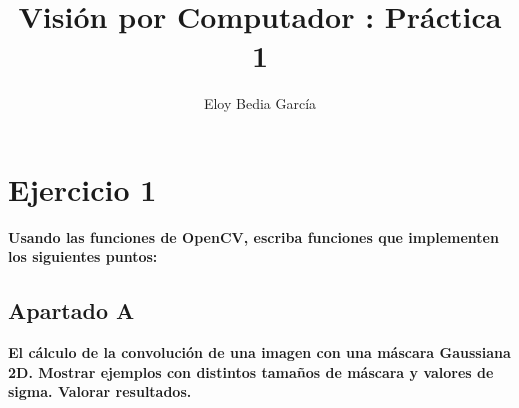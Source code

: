 \documentclass{article}
\title{Visión por Computador : Práctica 1}
\author{Eloy Bedia García}
\begin{document}
\maketitle
\newpage

\section*{Ejercicio 1}
\textbf{Usando las funciones de OpenCV, escriba funciones que implementen los siguientes puntos:}
\subsection*{Apartado A}
\textbf{El cálculo de la convolución de una imagen con una máscara Gaussiana 2D.
Mostrar ejemplos con distintos tamaños de máscara y valores de sigma. Valorar
resultados.}
\end{document}
